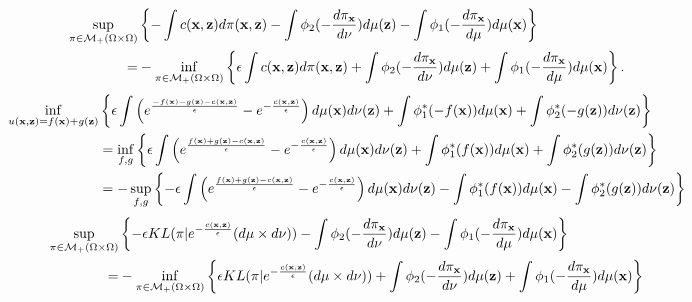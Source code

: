 \begin{align*}
\sup_{ \pi\in \mathcal{M}_+(\Omega\times \Omega)}&\left\lbrace  -\int c(\textbf{x},{{\textbf{z}}})d\pi(\textbf{x},{\textbf{{{\textbf{z}}}}})-\int \phi_2(-\frac{d\pi_\textbf{x}}{d\nu})d\mu({{\textbf{z}}})- \int \phi_1(-\frac{d\pi_\textbf{x}}{d\mu})d\mu(\textbf{x})\right\rbrace\\
=&-\inf_{ \pi\in \mathcal{M}_+(\Omega\times \Omega)}\left\lbrace\epsilon \int c(\textbf{x},{\textbf{{{\textbf{z}}}}})d\pi(\textbf{x},{\textbf{{{\textbf{z}}}}})+\int \phi_2(-\frac{d\pi_\textbf{x}}{d\nu})d\mu({{\textbf{z}}})+ \int \phi_1(-\frac{d\pi_\textbf{x}}{d\mu})d\mu(\textbf{x})\right\rbrace.
\end{align*}
\begin{align*}
\inf_{ u(\textbf{x},{\textbf{{{\textbf{z}}}}})=f(\textbf{x})+g({\textbf{{{\textbf{z}}}}})}&\left\lbrace \epsilon \int \left(e^{\frac{-f(\textbf{x})-g({\textbf{{{\textbf{z}}}}})-c(\textbf{x},{\textbf{{{\textbf{z}}}}})}{\epsilon}}-e^{-\frac{c(\textbf{x},{\textbf{{{\textbf{z}}}}})}{\epsilon}}\right)d\mu(\textbf{x}) d\nu({{\textbf{z}}})+\int\phi_1^*(-f(\textbf{x}))d\mu(\textbf{x})+\int \phi_2^*(-g({{\textbf{z}}})) d\nu({{\textbf{z}}})\right\rbrace\\ & = \inf_{f,g}\left\lbrace \epsilon \int \left(e^{\frac{f(\textbf{x})+g({\textbf{{{\textbf{z}}}}})-c(\textbf{x},{\textbf{{{\textbf{z}}}}})}{\epsilon}}-e^{-\frac{c(\textbf{x},{\textbf{{{\textbf{z}}}}})}{\epsilon}}\right)d\mu(\textbf{x}) d\nu({{\textbf{z}}})+\int\phi_1^*(f(\textbf{x}))d\mu(\textbf{x})+\int \phi_2^*(g({{\textbf{z}}})) d\nu({{\textbf{z}}})\right\rbrace\\
& = -\sup_{f,g}\left\lbrace -\epsilon \int \left(e^{\frac{f(\textbf{x})+g({\textbf{{{\textbf{z}}}}})-c(\textbf{x},{\textbf{{{\textbf{z}}}}})}{\epsilon}}-e^{-\frac{c(\textbf{x},{\textbf{{{\textbf{z}}}}})}{\epsilon}}\right)d\mu(\textbf{x}) d\nu({{\textbf{z}}})-\int\phi_1^*(f(\textbf{x}))d\mu(\textbf{x})-\int \phi_2^*(g({{\textbf{z}}})) d\nu({{\textbf{z}}})\right\rbrace\\
\end{align*}
\begin{align*}
\sup_{ \pi\in \mathcal{M}_+(\Omega\times \Omega)}&\left\lbrace-\epsilon KL(\pi|e^{-\frac{c(\textbf{x},{\textbf{{{\textbf{z}}}}})}{\epsilon}}(d\mu\times d\nu) )-\int \phi_2(-\frac{d\pi_\textbf{x}}{d\nu})d\mu({{\textbf{z}}})- \int \phi_1(-\frac{d\pi_\textbf{x}}{d\mu})d\mu(\textbf{x})\right\rbrace\\
=&-\inf_{ \pi\in \mathcal{M}_+(\Omega\times \Omega)}\left\lbrace\epsilon KL(\pi|e^{-\frac{c(\textbf{x},{\textbf{{{\textbf{z}}}}})}{\epsilon}}(d\mu\times d\nu) )+\int \phi_2(-\frac{d\pi_\textbf{x}}{d\nu})d\mu({{\textbf{z}}})+ \int \phi_1(-\frac{d\pi_\textbf{x}}{d\mu})d\mu(\textbf{x})\right\rbrace\\
\end{align*}
